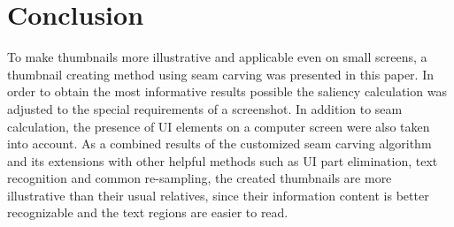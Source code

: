 \documentclass[draft,final]{vutinfth} %
\begin{document}
	\chapter{Conclusion}
	To make thumbnails more illustrative and applicable even on small screens, a thumbnail creating method using seam carving was presented in this paper.
	In order to obtain the most informative results possible the saliency calculation was adjusted to the special requirements of a screenshot.
	In addition to seam calculation, the presence of UI elements on a computer screen were also taken into account.
	As a combined results of the customized seam carving algorithm and its extensions with other helpful methods such as UI part elimination, text recognition and common re-sampling, the created thumbnails are more illustrative than their usual relatives, since their information content is better recognizable and the text regions are easier to read. 
	
	
	\backmatter
	
	
	
	
	
	
	
	
	
\end{document}

